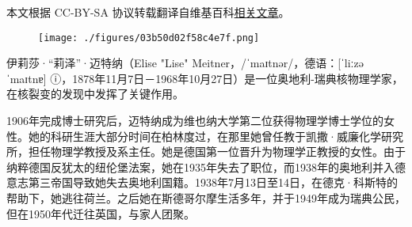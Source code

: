 
本文根据 CC-BY-SA 协议转载翻译自维基百科\href{https://en.wikipedia.org/wiki/Lise_Meitner}{相关文章}。

\begin{figure}[ht]
\centering
\texttt{[image: ./figures/03b50d02f58c4e7f.png]}
\caption{} \label{fig_LZm_1}
\end{figure}
伊莉莎·“莉泽”·迈特纳（Elise "Lise" Meitner，/ˈmaɪtnər/，德语：[ˈliːzə ˈmaɪtnɐ] ⓘ，1878年11月7日－1968年10月27日）是一位奥地利-瑞典核物理学家，在核裂变的发现中发挥了关键作用。

1906年完成博士研究后，迈特纳成为维也纳大学第二位获得物理学博士学位的女性。她的科研生涯大部分时间在柏林度过，在那里她曾任教于凯撒·威廉化学研究所，担任物理学教授及系主任。她是德国第一位晋升为物理学正教授的女性。由于纳粹德国反犹太的纽伦堡法案，她在1935年失去了职位，而1938年的奥地利并入德意志第三帝国导致她失去奥地利国籍。1938年7月13日至14日，在德克·科斯特的帮助下，她逃往荷兰。之后她在斯德哥尔摩生活多年，并于1949年成为瑞典公民，但在1950年代迁往英国，与家人团聚。
